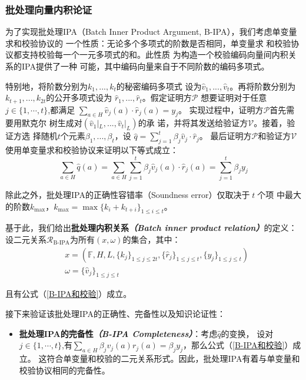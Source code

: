 \documentclass[zihao=-4]{ctexart}
\begin{document}
\begin{spacing}{1.5}
\subsubsection{批处理向量内积论证}
为了实现批处理IPA（Batch Inner Product Argument, B-IPA），我们考虑单变量求和校验协议的
一个性质：无论多个多项式的阶数是否相同，单变量求
和校验协议都支持校验每一个一元多项式的和\cite{six}。此性质
为构造一个校验编码向量间内积关系的IPA提供了一种
可能，其中编码向量来自于不同阶数的编码多项式。\par
特别地，将阶数分别为$k_1,...,k_t$的秘密编码多项式
设为$\hat{v}_1,...,\hat{v}_t$。再将阶数分别为
$k_{t+1},...,k_{2t}$的公开多项式设为
$\hat{r}_1,...,\hat{r}_t$。假定证明方$\mathcal{P}$
想要证明对于任意$j \in \{1,\cdots,t\}$,都满足
$\sum_{a\in H}\hat{v}_j(a)\cdot\hat{r}_j(a)=y_j$。
实现过程中，证明方$\mathcal{P}$首先需要用默克尔
树生成对$(\hat{v}_1|_L,...,\hat{v}_t|_L)$的承
诺，并将其发送给验证方$\mathcal{V}$。接着，验证方选
择随机$t$个元素$\beta_1,...,\beta_t$，设
$\hat{q}=\sum\limits_{j=1}^t\beta_j\hat{v}_j\cdot\hat{r}_j$。
最后证明方$\mathcal{P}$和验证方$\mathcal{V}$
使用单变量求和校验协议来证明以下等式成立：
\begin{equation}\sum_{a\in H}\hat{q}(a)=\sum_{a\in H}\sum\limits_{j=1}^t\beta_j\hat{v}_j(a)\cdot\hat{r}_j(a)=\sum\limits_{j=1}^t\beta_jy_j\label{B-IPA和校验}\end{equation}\par
除此之外，批处理IPA的正确性容错率（Soundness error）仅取决于$\;t\;$个项
中最大的阶数$k_{\max}$，$k_{\max}=\max\{k_i+k_{t+i}\}_{1\le i\le t}$。\par
基于此，我们给出\textbf{批处理内积关系\emph{（Batch inner product relation）}}的定义：设二元关系$\mathcal{R}_{\text{B-IPA}}$为所有$(x,\omega)$的集合，其中：
\[\begin{aligned}&x=(\mathbb{F},H,L,\{k_j\}_{1\le j\le2t},\{\hat{r}_j\}_{1\le j\le t},\{y_j\}_{1\le j\le t})\\&\omega=\{\hat{v}_j\}_{1\le j\le t}\end{aligned}\]\par
且有公式（\ref{B-IPA和校验}）成立。\par
接下来验证该批处理IPA的正确性、完备性以及知识论证性：\par
\begin{itemize}
  \item \textbf{批处理IPA的完备性\emph{（B-IPA Completeness）}}：考虑$\hat{q}$的变换，
        设对$j \in\{1,\cdots,t\}$,有$\sum_{a\in H}\beta_jv_j(a)r_j(a)=\beta_jy_j$，那么公式（\ref{B-IPA和校验}）成立。
        这符合单变量和校验的二元关系形式。因此，批处理IPA有着与单变量和校验协议相同的完备性。

\end{itemize}
\end{spacing}
\end{document}
